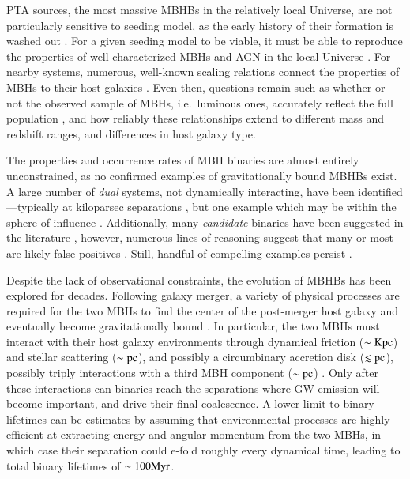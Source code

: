 \documentclass[useAMS, usenatbib]{src/mnras}
\begin{document}
    PTA sources, the most massive MBHBs in the relatively local Universe, are not particularly sensitive to seeding model, as the early history of their formation is washed out \needcite{}.  For a given seeding model to be viable, it must be able to reproduce the properties of well characterized MBHs and AGN in the local Universe \needcite{}.  For nearby systems, numerous, well-known scaling relations connect the properties of MBHs to their host galaxies .  Even then, questions remain such as whether or not the observed sample of MBHs, i.e.~luminous ones, accurately reflect the full population , and how reliably these relationships extend to different mass and redshift ranges, and differences in host galaxy type.

    The properties and occurrence rates of MBH binaries are almost entirely unconstrained, as no confirmed examples of gravitationally bound MBHBs exist.  A large number of \textit{dual} systems, not dynamically interacting, have been identified---typically at kiloparsec separations , but one example which may be within the sphere of influence .  Additionally, many \textit{candidate} binaries have been suggested in the literature , however, numerous lines of reasoning suggest that many or most are likely false positives .  Still, handful of compelling examples persist .

    Despite the lack of observational constraints, the evolution of MBHBs has been explored for decades.  Following galaxy merger, a variety of physical processes are required for the two MBHs to find the center of the post-merger host galaxy and eventually become gravitationally bound .  In particular, the two MBHs must interact with their host galaxy environments through dynamical friction ($\sim\mathrm{Kpc}$) and stellar scattering ($\sim \mathrm{pc}$), and possibly a circumbinary accretion disk ($\lesssim \mathrm{pc}$), possibly triply interactions with a third MBH component ($\sim \mathrm{pc}$) .  Only after these interactions can binaries reach the separations where GW emission will become important, and drive their final coalescence.  A lower-limit to binary lifetimes can be estimates by assuming that environmental processes are highly efficient at extracting energy and angular momentum from the two MBHs, in which case their separation could e-fold roughly every dynamical time, leading to total binary lifetimes of $\sim 100 \mathrm{Myr}$.
\end{document}
